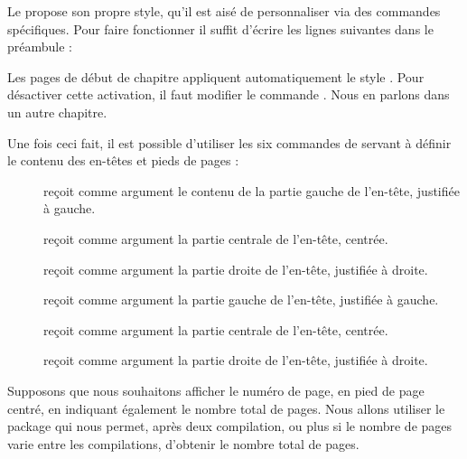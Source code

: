 Le  propose son propre style, qu'il est aisé de personnaliser via des commandes spécifiques. Pour faire fonctionner  il suffit d'écrire les lignes suivantes dans le préambule :

\begin{latexcode}
\usepackage{fancyhdr}
\pagestyle{fancy}
\end{latexcode}

\begin{plusloins}
Les pages de début de chapitre appliquent automatiquement le style . Pour désactiver cette activation, il faut modifier le commande . Nous en parlons dans un autre chapitre. 
\end{plusloins}


Une fois ceci fait, il est possible d'utiliser les six commandes de  servant à définir le contenu des en-têtes et pieds de pages :

\begin{description}
\item[] reçoit comme argument le contenu de la partie gauche de l'en-tête, justifiée à gauche.
\item[] reçoit comme argument la partie centrale de l'en-tête, centrée.
\item[] reçoit comme argument la partie droite de l'en-tête, justifiée à droite.
\item[] reçoit comme argument la partie gauche de l'en-tête, justifiée à gauche.
\item[] reçoit comme argument la partie centrale de l'en-tête, centrée.
\item[] reçoit comme argument la partie droite de l'en-tête, justifiée à droite.
\end{description}



Supposons que nous souhaitons afficher le numéro de page, en pied de page centré, en indiquant également le nombre total de pages. Nous allons utiliser le package  qui nous permet, après deux compilation, ou plus si le nombre de pages varie entre les compilations, d'obtenir le nombre total de pages.

\begin{latexcode}
\usepackage{fancyhdr}
\pagestyle{fancy}
\usepackage{totpages}
\cfoot{{\thepage} / \ref{TotPages}}
\end{latexcode}



